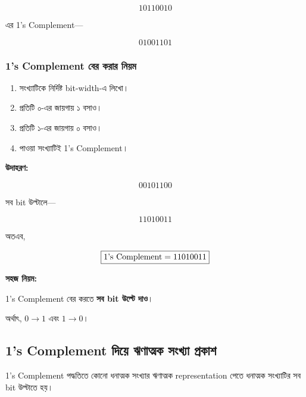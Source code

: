 \[
10110010
\]

এর \textenglish{1's Complement}—

\[
\boxed{01001101}
\]

\subsubsection*{\textenglish{1's Complement} বের করার নিয়ম}

\par\begingroup

\begin{enumerate}
    \item সংখ্যাটিকে নির্দিষ্ট \textenglish{bit-width}-এ লিখো।
    \item প্রতিটি ০-এর জায়গায় ১ বসাও।
    \item প্রতিটি ১-এর জায়গায় ০ বসাও।
    \item পাওয়া সংখ্যাটিই \textenglish{1's Complement}।
\end{enumerate}
\par\endgroup


\textbf{\textcolor{ICTOrange}{উদাহরণ:}}

\[
00101100
\]

সব \textenglish{bit} উল্টালে—

\[
11010011
\]

অতএব,

\[
\boxed{
\text{\textenglish{1's Complement}}=11010011
}
\]

\par\begingroup

\textbf{সহজ নিয়ম:}

\textenglish{1's Complement} বের করতে
\textbf{সব \textenglish{bit} উল্টে দাও}।

অর্থাৎ, $0\rightarrow1$ এবং $1\rightarrow0$।
\par\endgroup



\subsection{\textenglish{1's Complement} দিয়ে ঋণাত্মক সংখ্যা প্রকাশ}

\textenglish{1's Complement} পদ্ধতিতে কোনো ধনাত্মক সংখ্যার
ঋণাত্মক \textenglish{representation} পেতে
ধনাত্মক সংখ্যাটির সব \textenglish{bit} উল্টাতে হয়।

